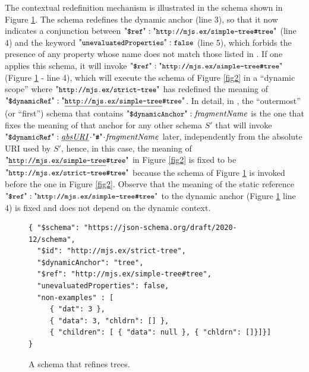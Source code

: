 The contextual redefinition mechanism is illustrated in the schema shown in Figure \ref{fig3}.
The schema  redefines the dynamic anchor
 (line 3), so that it now indicates a conjunction between  $\qdref: \qkw{http://mjs.ex/simple-tree\#tree}$ 
(line 4) and the keyword
$\qunProps: \afalse$ (line 5), which forbids the presence of any property whose name does not match those listed in .
If one applies this schema, it will invoke 
$\qdref: \qkw{http://mjs.ex/simple-tree\#tree}$ (Figure \ref{fig3} - line 4), which will execute the schema of
Figure \ref{fig2} in a ``dynamic scope'' %
where 
$\qkw{http://mjs.ex/strict-tree}$ has redefined the meaning of 
$\qddref: \qkw{\underline{http://mjs.ex/simple-tree}\#tree}$.
In detail, in {\DTwenty}, the ``outermost'' (or ``first'') schema that contains $\qdda: \key{fragmentName}$ is the one that 
fixes the meaning 
of that anchor for any other 
schema $S'$ that will invoke $\qddref : \key{\underline{absURI}}\catHash\key{fragmentName}$ later, independently from
the absolute URI  used by $S'$, hence, in this case, 
the meaning of $\qkw{\underline{http://mjs.ex/simple-tree}\#tree}$ in Figure  \ref{fig2} is fixed to be
$\qkw{http://mjs.ex/strict-tree\#tree}$ 
because the schema of Figure \ref{fig3} is invoked before
the one in Figure  \ref{fig2}. %
Observe that the meaning of the static reference
$\qdref : \qkw{http://mjs.ex/simple-tree\#tree}$ to the dynamic anchor  (Figure \ref{fig3} line 4) is fixed
and does not depend on the dynamic context.


\begin{figure}[htb!]
\begin{querybox}{}
\begin{lstlisting}[style=query,escapechar=Z]
{ "$schema": "https://json-schema.org/draft/2020-12/schema",
  "$id": "http://mjs.ex/strict-tree",
  "$dynamicAnchor": "tree",
  "$ref": "http://mjs.ex/simple-tree#tree",
  "unevaluatedProperties": false,
  "non-examples" : [
     { "dat": 3 },
     { "data": 3, "chldrn": [] },
     { "children": [ { "data": null }, { "chldrn": []}]}]
}
\end{lstlisting}
\end{querybox}
\caption{A schema that refines  trees.}\label{fig3}
\end{figure}



